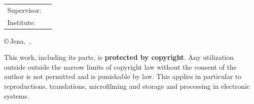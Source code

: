 \begin{titlepage}
\begin{center}
	\large
	\begin{tabular}{p{3cm}p{8cm}}\\
		Supervisor: & \quad \betreuer\\
		Institute: & \quad \unternehmen
	\end{tabular}
\end{center}

\newcommand{\mydate}{\monthname\,\the\day , \the\year}

\begin{center}
\copyright\,Jena, \mydate
\end{center}

\vspace{-.5cm}
\singlespacing
\small
\noindent This work, including its parts, is \textbf{protected by copyright}. Any utilization outside
outside the narrow limits of copyright law without the consent of the author is not permitted and is
punishable by law. This applies in particular to reproductions, translations, microfilming and storage and processing in electronic systems.

\end{titlepage}

